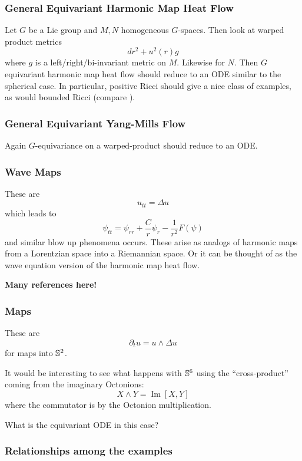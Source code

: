 \documentclass{amsart}
\begin{document}
\subsubsection*{General Equivariant Harmonic Map Heat Flow}

Let \(G\) be a Lie group and \(M, N\) homogeneous \(G\)-spaces. Then look at warped product metrics
\[
dr^2 + u^2(r) g
\]
where \(g\) is a left/right/bi-invariant metric on \(M\). Likewise for \(N\). Then \(G\) equivariant harmonic map heat flow should reduce to an ODE similar to the spherical case. In particular, positive Ricci should give a nice class of examples, as would bounded Ricci (compare \cite{Zhou2017,2016arXiv161005234M}).

\subsubsection*{General Equivariant Yang-Mills Flow}

Again \(G\)-equivariance on a warped-product should reduce to an ODE.

\subsubsection*{Wave Maps}

These are
\[
u_{tt} = \Delta u
\]
which leads to
\[
\psi_{tt} = \psi_{rr} + \frac{C}{r} \psi_r - \frac{1}{r^2} F(\psi)
\]
and similar blow up phenomena occurs. These arise as analogs of harmonic maps from a Lorentzian space into a Riemannian space. Or it can be thought of as the wave equation version of the harmonic map heat flow.

\textbf{Many references here!}

\subsubsection*{\schrodinger{} Maps}

These are
\[
\partial_t u = u \wedge \Delta u
\]
for maps into \(\S^2\).

It would be interesting to see what happens with \(\S^6\) using the ``cross-product'' coming from the imaginary Octonions:
\[
X \wedge Y = \operatorname{Im} [X, Y]
\]
where the commutator is by the Octonion multiplication.

What is the equivariant ODE in this case?

\subsubsection*{Relationships among the examples}
\end{document}
